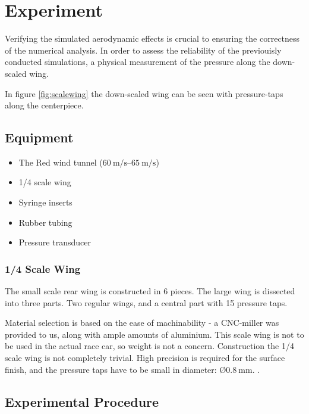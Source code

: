 \chapter{Experiment}




Verifying the simulated aerodynamic effects is crucial to ensuring the correctness of the numerical analysis. In order to assess the reliability of the previouisly conducted simulations, a physical measurement of the pressure along the down-scaled wing.

In figure \ref{fig:scalewing} the down-scaled wing can be seen with pressure-taps along the centerpiece.



\section{Equipment}

\begin{itemize}
  \item The Red wind tunnel ($\SIrange{60}{65}{\metre\per\second}$)
  \item 1/4 scale wing
  \item Syringe inserts
  \item Rubber tubing
  \item Pressure transducer
\end{itemize}

\subsection{1/4 Scale Wing}

The small scale rear wing is constructed in 6 pieces. The large wing is dissected into three parts. Two regular wings, and a central part with 15 pressure taps.

Material selection is based on the ease of machinability - a CNC-miller was provided to us, along with ample amounts of aluminium. This scale wing is not to be used in the actual race car, so weight is not a concern. Construction the 1/4 scale wing is not completely trivial. High precision is required for the surface finish, and the pressure taps have to be small in diameter: $Ø\SI{0.8}{\milli\metre}$. .

\section{Experimental Procedure}


